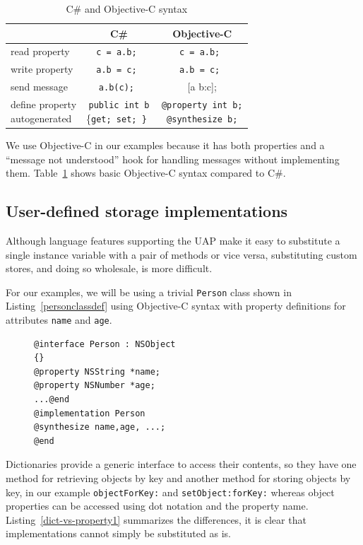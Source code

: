 \documentclass[preprint]{sigplanconf}
\begin{document}
\begin{table}
\center
\begin{tabular}{|l|c|c|} \hline
   & C\#  	 & Objective-C  		 \\\hline 
read property & {\tt c = a.b; }	 & {\tt c = a.b;  }		 \\\hline 
write property & {\tt a.b = c; }	 & {\tt a.b = c; }		 \\\hline 
send message & {\tt a.b(c);  }	 & { [a b:c]; }		 \\\hline 
\shortstack{{define property}\\{autogenerated}}  & \shortstack{ {\tt public int b} \\ { \{\tt get; set; \} }}  & \shortstack{{\tt @property int b;}\\{\tt @synthesize b;}}\\\hline 
\end{tabular}
\caption{C\# and Objective-C syntax}
\label{objc-syntax}
\end{table}

We use Objective-C in our examples because it has both properties and a ``message not understood''
hook for handling messages without implementing them.  Table~\ref{objc-syntax} shows basic
Objective-C syntax compared to C\#.  


\subsection{User-defined storage implementations}
\label{userdefined}
Although language features supporting the UAP make it easy to substitute a single 
instance variable with a pair of methods or vice versa, substituting custom stores,
and doing so wholesale, is more difficult.

For our examples, we will be using a trivial {\tt Person} class shown in Listing~\ref{personclassdef}
using Objective-C syntax with property definitions for attributes {\tt name} and {\tt age}.

\begin{figure}[htbp]
\begin{lstlisting}[style=numbers,label=personclassdef,caption=Person class.]
@interface Person : NSObject 
{}
@property NSString *name;
@property NSNumber *age;
...@end
@implementation Person
@synthesize name,age, ...;
@end
\end{lstlisting}
\end{figure}


Dictionaries provide a generic interface to access their contents, so they have
one method for retrieving objects by key and another method for storing objects
by key, in our example {\tt objectForKey:} and {\tt setObject:forKey:} whereas
object properties can be accessed using dot notation and the property name.
Listing~\ref{dict-vs-property1} summarizes the differences, it is clear that implementations
cannot simply be substituted as is.
\end{document}
